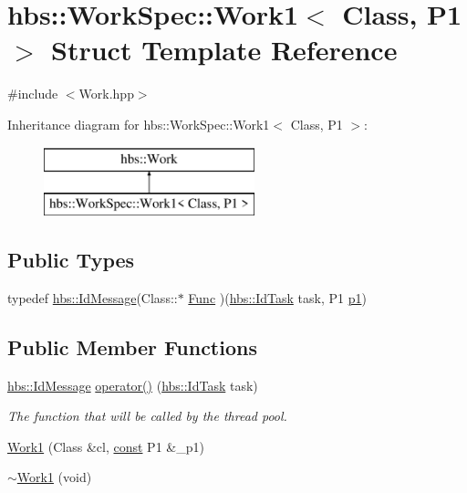 \hypertarget{structhbs_1_1_work_spec_1_1_work1}{\section{hbs\-:\-:Work\-Spec\-:\-:Work1$<$ Class, P1 $>$ Struct Template Reference}
\label{structhbs_1_1_work_spec_1_1_work1}
}


{\ttfamily \#include $<$Work.\-hpp$>$}

Inheritance diagram for hbs\-:\-:Work\-Spec\-:\-:Work1$<$ Class, P1 $>$\-:\begin{figure}[H]
\begin{center}
\leavevmode
\includegraphics[height=2.000000cm]{structhbs_1_1_work_spec_1_1_work1}
\end{center}
\end{figure}
\subsection*{Public Types}
\begin{DoxyCompactItemize}
\item 
typedef \hyperlink{namespacehbs_a6d744a52db9bca0a9752a009118641f4}{hbs\-::\-Id\-Message}(Class\-::$\ast$ \hyperlink{structhbs_1_1_work_spec_1_1_work1_af6366a85e83cfa25360693d314dace5b}{Func} )(\hyperlink{namespacehbs_aab8d06205ac2b0b14186327fd6c1c0d6}{hbs\-::\-Id\-Task} task, P1 \hyperlink{structhbs_1_1_work_spec_1_1_work1_ab06fc99d119bd4db78a0755de8bce3a5}{p1})
\end{DoxyCompactItemize}
\subsection*{Public Member Functions}
\begin{DoxyCompactItemize}
\item 
\hyperlink{namespacehbs_a6d744a52db9bca0a9752a009118641f4}{hbs\-::\-Id\-Message} \hyperlink{structhbs_1_1_work_spec_1_1_work1_a90c7f3a80817ca63e96a4e9d8c9e6047}{operator()} (\hyperlink{namespacehbs_aab8d06205ac2b0b14186327fd6c1c0d6}{hbs\-::\-Id\-Task} task)
\begin{DoxyCompactList}\small\item\em The function that will be called by the thread pool. \end{DoxyCompactList}\item 
\hyperlink{structhbs_1_1_work_spec_1_1_work1_a415a1da8295b9ad7fb13a299a3a48edb}{Work1} (Class \&cl, \hyperlink{term__entry_8h_a57bd63ce7f9a353488880e3de6692d5a}{const} P1 \&\-\_\-p1)
\item 
\hyperlink{structhbs_1_1_work_spec_1_1_work1_a8f03676855be35a67d10f0a98ae1a479}{$\sim$\-Work1} (void)
\end{DoxyCompactItemize}
